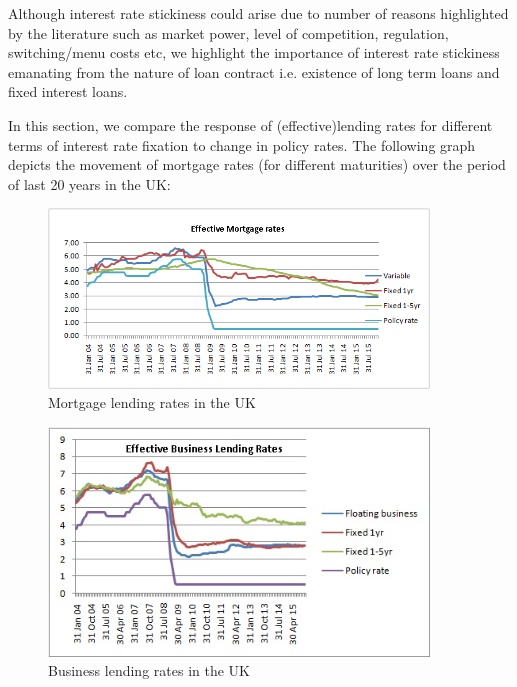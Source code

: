 \documentclass[12pt]{article}
\numberwithin{equation}{section}
\begin{document}
Although interest rate stickiness could arise due to number of reasons highlighted by the literature such as market power, level of competition, regulation, switching/menu costs etc, we highlight the importance of interest rate stickiness emanating from the nature of loan contract i.e. existence of long term loans and fixed interest loans.


In this section, we compare the response of (effective)lending rates for different terms of interest rate fixation to change in policy rates. The following graph depicts the movement of mortgage rates (for different maturities) over the period of last 20 years in the UK:
\begin{figure}[h!] 
\label{uk_mortgage_chart}
	\caption{Mortgage lending rates in the UK} 
	\centering
	
	\includegraphics[width=0.9\textwidth]{mortgage}
	
\end{figure}

\begin{figure}[h!] 
\label{uk_corp_chart}
	\caption{Business lending rates in the UK} 
	\includegraphics[width=0.9\textwidth]{busirate}
	
\end{figure}
\end{document}
